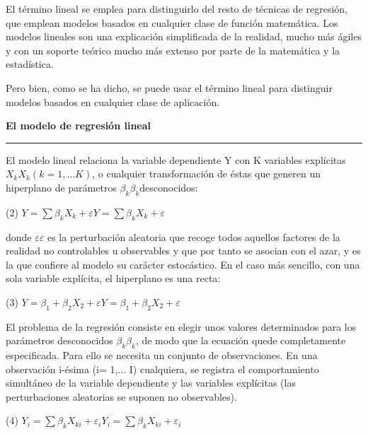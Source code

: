 \documentclass{article}
\begin{document}
El t\'ermino lineal se emplea para distinguirlo del resto de t\'ecnicas de regresi\'on, que emplean modelos basados en cualquier clase de funci\'on matem\'atica. Los modelos lineales son una explicaci\'on simplificada de la realidad, mucho m\'as \'agiles y con un soporte te\'orico mucho m\'as extenso por parte de la matem\'atica y la estadística.

Pero bien, como se ha dicho, se puede usar el t\'ermino lineal para distinguir modelos basados en cualquier clase de aplicaci\'on.

\vspace{3pt}
\begin{flushleft}
{\large{\textbf{El modelo de regresi\'on lineal}}}
\end{flushleft}
\vspace{1pt}
\hrule

El modelo lineal relaciona la variable dependiente Y con K variables explícitas ${\displaystyle X_{k}} {\displaystyle X_{k}} (k = 1,...K)$, o cualquier transformaci\'on de \'estas que generen un hiperplano de par\'ametros ${\displaystyle \beta _{k}} {\displaystyle \beta _{k}}$desconocidos:

(2) ${\displaystyle Y=\sum \beta _{k}X_{k}+\varepsilon } {\displaystyle Y=\sum \beta _{k}X_{k}+\varepsilon }$

donde ${\displaystyle \varepsilon } {\displaystyle \varepsilon }$ es la perturbaci\'on aleatoria que recoge todos aquellos factores de la realidad no controlables u observables y que por tanto se asocian con el azar, y es la que confiere al modelo su car\'acter estoc\'astico. En el caso m\'as sencillo, con una sola variable explícita, el hiperplano es una recta:

(3) ${\displaystyle Y=\beta _{1}+\beta _{2}X_{2}+\varepsilon } {\displaystyle Y=\beta _{1}+\beta _{2}X_{2}+\varepsilon }$

El problema de la regresi\'on consiste en elegir unos valores determinados para los par\'ametros desconocidos ${\displaystyle \beta _{k}} {\displaystyle \beta _{k}}$, de modo que la ecuaci\'on quede completamente especificada. Para ello se necesita un conjunto de observaciones. En una observaci\'on i-\'esima (i= 1,... I) cualquiera, se registra el comportamiento simult\'aneo de la variable dependiente y las variables explícitas (las perturbaciones aleatorias se suponen no observables).

(4) ${\displaystyle Y_{i}=\sum \beta _{k}X_{ki}+\varepsilon _{i}} {\displaystyle Y_{i}=\sum \beta _{k}X_{ki}+\varepsilon _{i}}$
\end{document}
